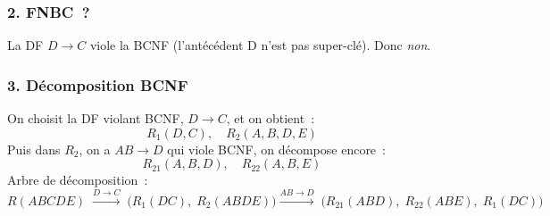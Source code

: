 \documentclass[a4paper,12pt]{article}
\begin{document}
\subsubsection*{2. FNBC ?}
La DF $D\to C$ viole la BCNF (l'antécédent D n'est pas super-clé). Donc \emph{non}.

\subsubsection*{3. Décomposition BCNF}
On choisit la DF violant BCNF, $D\to C$, et on obtient :
\[
  R_1(D,C),
  \quad R_2(A,B,D,E)
\]
Puis dans $R_2$, on a $AB\to D$ qui viole BCNF, on décompose encore :
\[
  R_{21}(A,B,D),
  \quad R_{22}(A,B,E)
\]
Arbre de décomposition :
\[
  R(ABCDE)\;
  \xrightarrow{D\to C}\;
  \bigl(R_1(DC),\;R_2(ABDE)\bigr)
  \xrightarrow{AB\to D}\;
  \bigl(R_{21}(ABD),\;R_{22}(ABE),\;R_1(DC)\bigr)
\]
\end{document}
